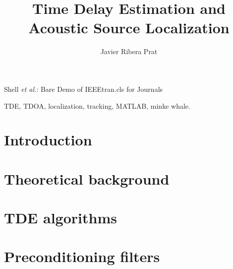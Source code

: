 \documentclass[journal]{IEEEtran}
\begin{document}
\title{Time Delay Estimation and \\Acoustic Source Localization}

\author{ Javier Ribera Prat }

{Shell \MakeLowercase{\textit{et al.}}: Bare Demo of IEEEtran.cls for Journals}

\maketitle


\begin{abstract}
  
\end{abstract}

\begin{IEEEkeywords}
  TDE, TDOA, localization, tracking, MATLAB, minke whale.
\end{IEEEkeywords}






%
\IEEEpeerreviewmaketitle



\section{Introduction}
  
  
  
\section{Theoretical background}
  


\section{TDE algorithms}
  
  
  
\section{Preconditioning filters}
  
\end{document}
